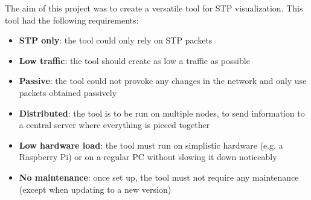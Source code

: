 The aim of this project was to create a versatile tool for STP visualization.
This tool had the following requirements:
\begin{itemize}
    \item \textbf{STP only}: the tool could only rely on STP packets
    \item \textbf{Low traffic}: the tool should create as low a traffic as possible
    \item \textbf{Passive}: the tool could not provoke any changes in the network and only use packets obtained passively
    \item \textbf{Distributed}: the tool is to be run on multiple nodes, to send information to a central server where everything is pieced together
    \item \textbf{Low hardware load}: the tool must run on simplistic hardware (e.g. a Raspberry Pi) or on a regular PC without slowing it down noticeably
    \item \textbf{No maintenance}: once set up, the tool must not require any maintenance (except when updating to a new version)
\end{itemize}

